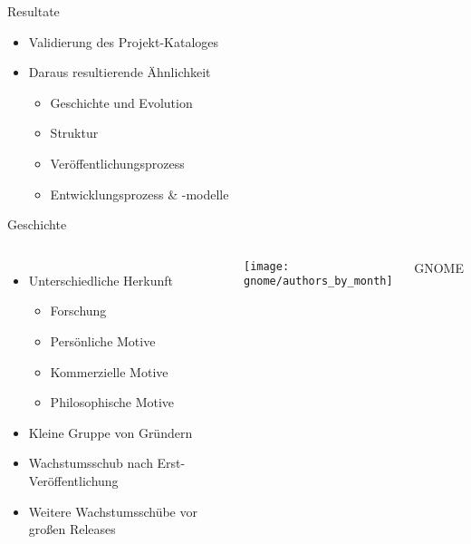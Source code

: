 \documentclass[11pt]{beamer}
\newlength{\colwidth}
\begin{document}
\begin{frame}[T]{Resultate}
  \begin{itemize}
    \item Validierung des Projekt-Kataloges
    \item Daraus resultierende Ähnlichkeit
    \begin{itemize}
      \item Geschichte und Evolution
      \item Struktur
      \item Veröffentlichungsprozess
      \item Entwicklungsprozess \& -modelle
    \end{itemize}
  \end{itemize}
\end{frame}

\begin{frame}{Geschichte}
  \begin{columns}
  \column{\colwidth}
  \begin{itemize}
    \item Unterschiedliche Herkunft
    \begin{itemize}
      \item Forschung
      \item Persönliche Motive
      \item Kommerzielle Motive
      \item Philosophische Motive
    \end{itemize}
    \item Kleine Gruppe von Gründern
    \item Wachstumsschub nach Erst-Veröffentlichung
    \item Weitere Wachstumsschübe vor großen Releases
  \end{itemize}
  \column{\colwidth}
    \texttt{[image: gnome/authors\_by\_month]}

    {\tiny\hfill
    GNOME
    }
  \end{columns}
\end{frame}
\end{document}
